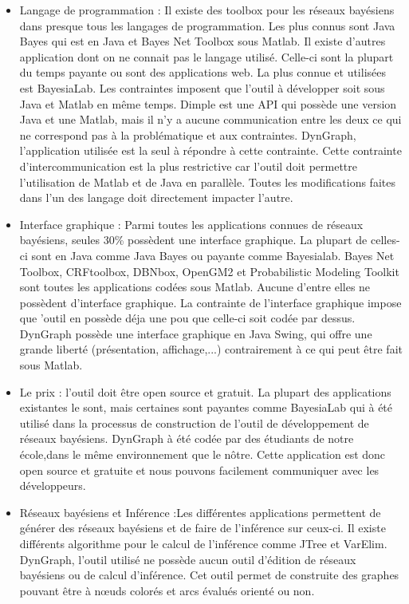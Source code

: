 \documentclass[conference]{IEEEtran}
\begin{document}
\begin{itemize}
	\item{Langage de programmation :} Il existe des toolbox pour les réseaux bayésiens dans presque tous les langages de programmation. Les plus connus sont Java Bayes qui est en Java et Bayes Net Toolbox sous Matlab. Il existe d'autres application dont on ne connait pas le langage utilisé. Celle-ci sont la plupart du temps payante ou sont des applications web. La plus connue et utilisées est BayesiaLab. Les contraintes imposent que l'outil à développer soit sous Java et Matlab en même temps. Dimple est une API qui possède une version Java et une Matlab, mais il n'y a aucune communication entre les deux ce qui ne correspond pas à la problématique et aux contraintes. DynGraph, l'application utilisée est la seul à répondre à cette contrainte. Cette contrainte d'intercommunication est la plus restrictive car l'outil doit permettre l'utilisation de Matlab et de Java en parallèle. Toutes les modifications faites dans l'un des langage doit directement impacter l'autre. 
	
	\item{Interface graphique :} Parmi toutes les applications connues de réseaux bayésiens, seules 30\% possèdent une interface graphique. La plupart de celles-ci sont en Java comme Java Bayes ou payante comme Bayesialab. Bayes Net Toolbox, CRFtoolbox, DBNbox, OpenGM2 et Probabilistic Modeling Toolkit sont toutes les applications codées sous Matlab. Aucune d'entre elles ne possèdent d'interface graphique. La contrainte de l'interface graphique impose que 'outil en possède déja une pou que celle-ci soit codée par dessus. DynGraph possède une interface graphique en Java Swing, qui offre une grande liberté (présentation, affichage,...) contrairement à ce qui peut être fait sous Matlab. 

	\item{Le prix :} l'outil doit être open source et gratuit. La plupart des applications  existantes le sont, mais certaines sont payantes comme BayesiaLab qui à été utilisé dans la processus de construction de l'outil de développement de réseaux bayésiens. DynGraph à été codée par des étudiants de notre école,dans le même environnement que le nôtre. Cette application est donc open source et gratuite et nous pouvons facilement communiquer avec les développeurs.
	
	\item{Réseaux bayésiens et Inférence :}Les différentes applications permettent de générer des réseaux bayésiens et de faire de l'inférence sur ceux-ci. Il existe différents algorithme pour le calcul de l'inférence comme JTree et VarElim. DynGraph, l'outil utilisé ne possède aucun outil d'édition de réseaux bayésiens ou de calcul d'inférence. Cet outil permet de construite des graphes pouvant être à nœuds colorés et arcs évalués orienté ou non. 
	
\end{itemize}
\end{document}
